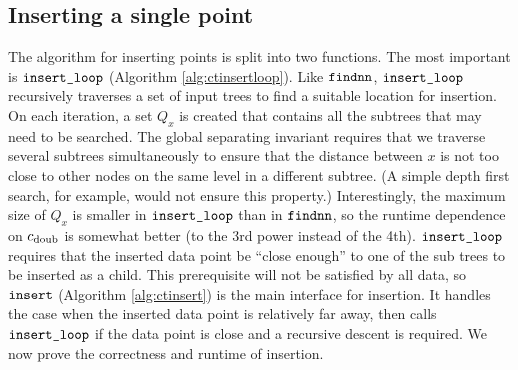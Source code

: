 \documentclass[../main.tex]{subfiles}
\makeatletter
\newcommand{\dist}[2]{\distf({#1},{#2})}
\newcommand{\distf}{d}
\newcommand{\cdoub}{c_\textnormal{doub}}
\newcommand{\q}{\ensuremath q}
\newcommand{\mkfunction}[1]{\ifmmode{\textnormal{{#1}}}}
\newcommand{\maxdist}[1]    {\mkfunction{maxdist}({#1})}
\newcommand{\data}[1]       {\mkfunction{data}({#1})}
\newcommand{\nn}[1]         {\mkfunction{nn}[{#1}]}
\def\nn{\@ifstar\@nn\@@nn}
\def\@nn#1{\mkfunction{nn}^*[{#1}]}
\def\@@nn#1{\mkfunction{nn}[{#1}]}
\newcommand{\mkprocedure}[1]{\textnormal{\ttfamily {#1}}}
\newcommand{\findnn}{\mkprocedure{findnn}}
\newcommand{\ctinsert}{\ensuremath{\textnormal{\ttfamily insert}}}
\newcommand{\ctinsertloop}{\ensuremath{\textnormal{\ttfamily insert\_loop}}}
\makeatother
\begin{document}



\subsection{Inserting a single point}

The algorithm for inserting points is split into two functions.
The most important is $\ctinsertloop$ (Algorithm \ref{alg:ctinsertloop}).
Like $\findnn$, $\ctinsertloop$ recursively traverses a set of input trees to find a suitable location for insertion.
On each iteration,
a set $Q_x$ is created that contains all the subtrees that may need to be searched.
The global separating invariant requires that we traverse several subtrees simultaneously to ensure that the distance between $x$ is not too close to other nodes on the same level in a different subtree.
(A simple depth first search, for example, would not ensure this property.)
Interestingly, the maximum size of $Q_x$ is smaller in $\ctinsertloop$ than in $\findnn$,
so the runtime dependence on $\cdoub$ is somewhat better
(to the 3rd power instead of the 4th).
$\ctinsertloop$ requires that the inserted data point be ``close enough'' to one of the sub trees to be inserted as a child. 
This prerequisite will not be satisfied by all data, 
so $\ctinsert$ (Algorithm \ref{alg:ctinsert}) is the main interface for insertion.
It handles the case when the inserted data point is relatively far away,
then calls $\ctinsertloop$ if the data point is close and a recursive descent is required.
We now prove the correctness and runtime of insertion.
\end{document}
